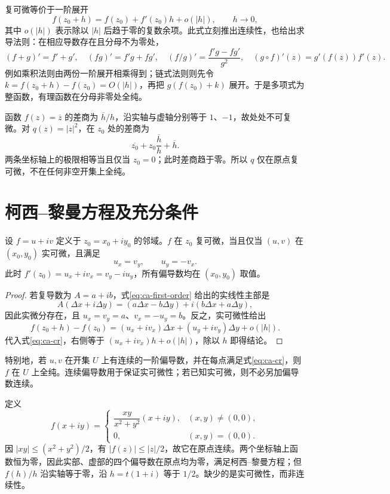\documentclass[UTF8,12pt,a4paper,fontset=fandol]{ctexbook}
\begin{document}
复可微等价于一阶展开
\begin{equation}
 f(z_0+h)=f(z_0)+f'(z_0)h+o(|h|),\qquad h\to0,
 \label{eq:ca-first-order}
\end{equation}
其中 $o(|h|)$ 表示除以 $|h|$ 后趋于零的复数余项。此式立刻推出连续性，也给出求导法则：在相应导数存在且分母不为零处，
\[
 (f+g)'=f'+g',\quad (fg)'=f'g+fg',\quad
 (f/g)'=\frac{f'g-fg'}{g^2},\quad
 (g\circ f)'(z)=g'(f(z))f'(z).
\]
例如乘积法则由两份一阶展开相乘得到；链式法则则先令 $k=f(z_0+h)-f(z_0)=O(|h|)$，再把 $g(f(z_0)+k)$ 展开。于是多项式为整函数，有理函数在分母非零处全纯。

\begin{example}[点态可微与全纯]
函数 $f(z)=\overline z$ 的差商为 $\overline h/h$，沿实轴与虚轴分别等于 $1$、$-1$，故处处不可复微。对 $q(z)=|z|^2$，在 $z_0$ 处的差商为
\[
 \overline{z_0}+z_0\frac{\overline h}{h}+\overline h.
\]
两条坐标轴上的极限相等当且仅当 $z_0=0$；此时差商趋于零。所以 $q$ 仅在原点复可微，不在任何非空开集上全纯。
\end{example}

\section{柯西--黎曼方程及充分条件}

\begin{theorem}[复可微的实变量判别]
\label{thm:ca-cr}
设 $f=u+iv$ 定义于 $z_0=x_0+iy_0$ 的邻域。$f$ 在 $z_0$ 复可微，当且仅当 $(u,v)$ 在 $(x_0,y_0)$ 实可微，且满足
\begin{equation}
 u_x=v_y,\qquad u_y=-v_x.
 \label{eq:ca-cr}
\end{equation}
此时 $f'(z_0)=u_x+iv_x=v_y-iu_y$，所有偏导数均在 $(x_0,y_0)$ 取值。
\end{theorem}
\begin{proof}
若复导数为 $A=a+ib$，式\eqref{eq:ca-first-order} 给出的实线性主部是
\[
 A(\Delta x+i\Delta y)=(a\Delta x-b\Delta y)
       +i(b\Delta x+a\Delta y),
\]
因此实微分存在，且 $u_x=v_y=a$、$v_x=-u_y=b$。反之，实可微性给出
\[
 f(z_0+h)-f(z_0)=(u_x+iv_x)\Delta x+(u_y+iv_y)\Delta y+o(|h|).
\]
代入式\eqref{eq:ca-cr}，右侧等于 $(u_x+iv_x)h+o(|h|)$，除以 $h$ 即得结论。
\end{proof}

特别地，若 $u,v$ 在开集 $U$ 上有连续的一阶偏导数，并在每点满足式\eqref{eq:ca-cr}，则 $f$ 在 $U$ 上全纯。连续偏导数用于保证实可微性；若已知实可微，则不必另加偏导数连续。

\begin{example}[仅有偏导数的反例]
定义
\[
 f(x+iy)=\begin{cases}
 \dfrac{xy}{x^2+y^2}(x+iy),&(x,y)\ne(0,0),\\
 0,&(x,y)=(0,0).
 \end{cases}
\]
因 $|xy|\le(x^2+y^2)/2$，有 $|f(z)|\le|z|/2$，故它在原点连续。两个坐标轴上函数恒为零，因此实部、虚部的四个偏导数在原点均为零，满足柯西--黎曼方程；但 $f(h)/h$ 沿实轴等于零，沿 $h=t(1+i)$ 等于 $1/2$。缺少的是实可微性，而非连续性。
\end{example}
\end{document}
